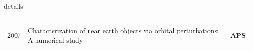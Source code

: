 \documentclass[10pt,letterpaper]{moderncv}
\begin{document}
\begin{taggedblock}{details}
\begin{tabularx}{\textwidth}{p{.33in}X>{\bfseries}r}
\end{tabularx}

\begin{tabularx}{\textwidth}{p{.33in}X>{\bfseries}r}
     2007 & Characterization of near earth objects via orbital perturbations: A numerical study & APS

\end{tabularx}
\end{taggedblock}




\end{document}

